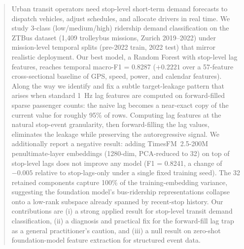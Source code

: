 \begin{abstract}
Urban transit operators need stop-level short-term demand forecasts to
dispatch vehicles, adjust schedules, and allocate drivers in real time.
We study 3-class (low/medium/high) ridership demand classification on
the ZTBus dataset (1,409 trolleybus missions, Zurich 2019--2022) under
mission-level temporal splits (pre-2022 train, 2022 test) that mirror
realistic deployment. Our best model, a Random Forest with stop-level
lag features, reaches temporal macro-F1 = 0.8287 ($+0.2221$ over a
57-feature cross-sectional baseline of GPS, speed, power, and calendar
features). Along the way we identify and fix a subtle target-leakage
pattern that arises when standard 1~Hz lag features are computed on
forward-filled sparse passenger counts: the naive lag becomes a
near-exact copy of the current value for roughly 95\% of rows.
Computing lag features at the natural stop-event granularity, then
forward-filling the lag values, eliminates the leakage while
preserving the autoregressive signal. We additionally report a
negative result: adding TimesFM~2.5-200M penultimate-layer embeddings
(1280-dim, PCA-reduced to 32) on top of stop-level lags does not
improve any model (F1 = 0.8241, a change of $-0.005$ relative to
stop-lags-only under a single fixed training seed). The 32 retained
components capture 100\% of the training-embedding variance,
suggesting the foundation model's bus-ridership representations
collapse onto a low-rank subspace already spanned by recent-stop
history. Our contributions are (i) a strong applied result for
stop-level transit demand classification, (ii) a diagnosis and
practical fix for the forward-fill lag trap as a general
practitioner's caution, and (iii) a null result on zero-shot
foundation-model feature extraction for structured event data.
\end{abstract}
